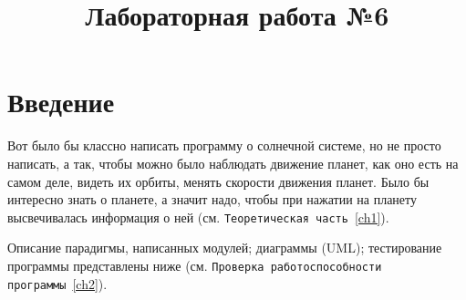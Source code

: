 \documentclass[14pt, oneside]{altsu-report}
\title{Лабораторная работа №6}
\institute{Институт цифровых технологий, электроники и физики}
\date{\the\year}
\begin{document}
\maketitle

\setcounter{page}{2}
\makeabstract
\tableofcontents

\chapter*{Введение}

Вот было бы классно написать программу о солнечной системе, но не просто написать, а так, чтобы можно было наблюдать движение планет, как оно есть на самом деле, видеть их орбиты, менять скорости движения планет. Было бы интересно знать о планете, а значит надо, чтобы при нажатии на планету высвечивалась информация о ней (см. \texttt{Теоретическая часть}~\ref{ch1}).

Описание парадигмы, написанных модулей; диаграммы (UML); тестирование программы представлены ниже (см. \texttt{Проверка работоспособности программы}~\ref{ch2}).
\end{document}
